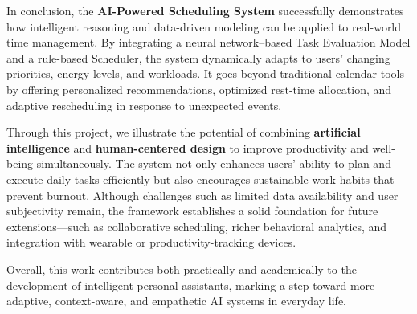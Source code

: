 \documentclass[12pt, a4paper]{article}
\begin{document}
In conclusion, the \textbf{AI-Powered Scheduling System} successfully demonstrates how intelligent reasoning and data-driven modeling can be applied to real-world time management. By integrating a neural network–based Task Evaluation Model and a rule-based Scheduler, the system dynamically adapts to users’ changing priorities, energy levels, and workloads. It goes beyond traditional calendar tools by offering personalized recommendations, optimized rest-time allocation, and adaptive rescheduling in response to unexpected events.

Through this project, we illustrate the potential of combining \textbf{artificial intelligence} and \textbf{human-centered design} to improve productivity and well-being simultaneously. The system not only enhances users’ ability to plan and execute daily tasks efficiently but also encourages sustainable work habits that prevent burnout. Although challenges such as limited data availability and user subjectivity remain, the framework establishes a solid foundation for future extensions—such as collaborative scheduling, richer behavioral analytics, and integration with wearable or productivity-tracking devices.

Overall, this work contributes both practically and academically to the development of intelligent personal assistants, marking a step toward more adaptive, context-aware, and empathetic AI systems in everyday life.
\end{document}
